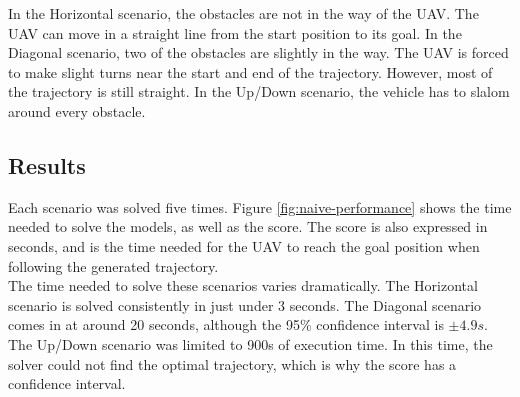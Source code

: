 In the Horizontal scenario, the obstacles are not in the way of the UAV. The UAV can move in a straight line from the start position to its goal. In the Diagonal scenario, two of the obstacles are slightly in the way. The UAV is forced to make slight turns near the start and end of the trajectory. However, most of the trajectory is still straight. In the Up/Down scenario, the vehicle has to slalom around every obstacle.\\
\subsection{Results}
\label{subsec:naive-results}

Each scenario was solved five times. Figure \ref{fig:naive-performance} shows the time needed to solve the models, as well as the score. The score is also expressed in seconds, and is the time needed for the UAV to reach the goal position when following the generated trajectory. \\
The time needed to solve these scenarios varies dramatically. The Horizontal scenario is solved consistently in just under 3 seconds. The Diagonal scenario comes in at around 20 seconds, although the 95\% confidence interval is $\pm 4.9s$. The Up/Down scenario was limited to 900s of execution time. In this time, the solver could not find the optimal trajectory, which is why the score has a confidence interval.
